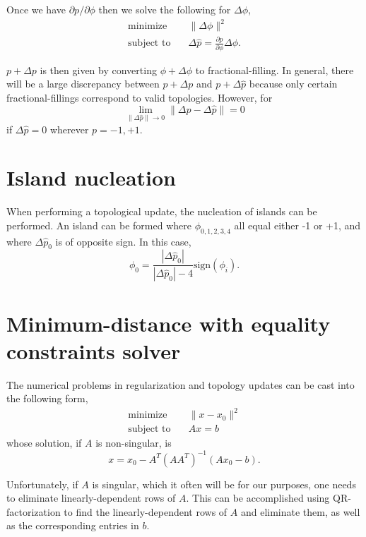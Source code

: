 \documentclass{article}
\begin{document}
Once we have $\partial p / \partial \phi$ then we solve the following for $\Delta \phi$,
\begin{align}
    \text{minimize} \quad & \| \Delta \phi \|^2 \\
    \text{subject to} \quad & \Delta \hat{p} = 
        \frac{\partial p}{\partial \phi} \Delta \phi.
\end{align}

$p + \Delta p$ is then given by converting $\phi + \Delta\phi$ to fractional-filling. In general, there will be a large discrepancy between $p + \Delta p$ and $p + \Delta \hat{p}$ because only certain fractional-fillings correspond to valid topologies. However, for 
\begin{equation}
    \lim_{\|\Delta\hat{p}\| \to 0} \|\Delta p - \Delta\hat{p}\| = 0
\end{equation}
if $\Delta\hat{p} = 0$ wherever $p = -1, +1$. 

\section{Island nucleation}
When performing a topological update, the nucleation of islands can be performed. An island can be formed where $\phi_{0,1,2,3,4}$ all equal either -1 or +1, and where $\Delta\hat{p}_0$ is of opposite sign. In this case,
\begin{equation}
\phi_0 = \frac{|\Delta \hat{p}_0|}{|\Delta \hat{p}_0| - 4} \text{sign}(\phi_i).
\end{equation}    



\appendix
\section{Minimum-distance with equality constraints solver}
The numerical problems in regularization and topology updates can be cast into the following form,
\begin{align}
    \text{minimize} \quad & \| x - x_0 \|^2 \\
    \text{subject to} \quad & Ax = b
\end{align}
whose solution, if $A$ is non-singular, is
\begin{equation}
    x = x_0 - A^T (A A^T)^{-1} (A x_0 - b).
\end{equation}

Unfortunately, if $A$ is singular, which it often will be for our purposes, one needs to eliminate linearly-dependent rows of $A$. This can be accomplished using QR-factorization to find the linearly-dependent rows of $A$ and eliminate them, as well as the corresponding entries in $b$.
\end{document}
